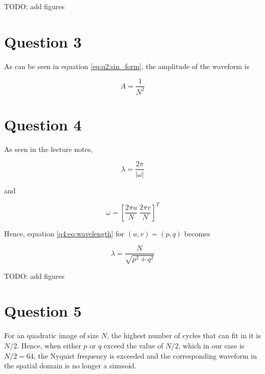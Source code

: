 \documentclass[12pt]{article}
\begin{document}
  TODO: add figures
  
	  	\begin{figure}[!htb]
			\centering
			\scalebox{.5}{}
			\caption{}
			\label{fig:}
	  	\end{figure}

	  	\begin{figure}[!htb]
			\centering
			\caption{}
			\label{fig:}
	  	\end{figure}

	\section{Question 3}

		As can be seen in equation \ref{eq:q2:sin_form}, the amplitude of the waveform is
	
		\begin{equation}
			A = \dfrac{1}{N^2}
		\end{equation}
	
	\section{Question 4}
	
		As seen in the lecture notes, 
		
		\begin{equation}
			\lambda = \frac{2 \pi}{|\omega|}
			\label{q4:eq:wavelength}
		\end{equation}
		
		and 
		
		\begin{equation}
			\omega = [\frac{2 \pi u}{N} \ \frac{2 \pi v}{N}]^T
		\end{equation}
		
		Hence, equation \ref{q4:eq:wavelength} for $(u,v)=(p,q)$ becomes
		
		\begin{equation}
			\lambda = \frac{N}{\sqrt{p^2+q^2}}
		\end{equation}
		
		TODO: add figures
		
		
	\section{Question 5}
	
		For an quadratic image of size $N$, the highest number of cycles that can fit in it is $N/2$. 
		Hence, when either $p$ or $q$ exceed the value of $N/2$, which in our case is $N/2 = 64$, the Nyquist frequency is exceeded
		and the corresponding waveform in the spatial domain is no longer a sinusoid.
		
\end{document}
